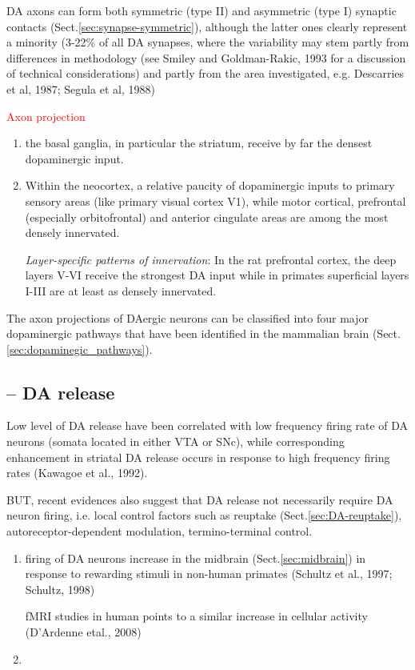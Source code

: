 DA axons can form both symmetric (type II) and asymmetric (type I) synaptic
contacts (Sect.\ref{sec:synapse-symmetric}), although the latter ones clearly
represent a minority (3-22\% of all DA synapses, where the variability may stem
partly from differences in methodology (see Smiley and Goldman-Rakic, 1993 for a
discussion of technical considerations) and partly from the area investigated,
e.g. Descarries et al, 1987; Segula et al, 1988)

\textcolor{red}{Axon projection}
\begin{enumerate}
  \item the basal ganglia, in particular the striatum, receive by far the
  densest dopaminergic input.
  
  \item Within the neocortex,  a relative paucity of dopaminergic inputs to
  primary sensory areas (like primary visual cortex V1), while motor cortical,
  prefrontal (especially orbitofrontal) and anterior cingulate areas are among
  the most densely innervated.
  
  {\it Layer-specific patterns of innervation}:
  In the rat prefrontal cortex, the deep layers V-VI receive the strongest DA
  input while in primates superficial layers I-III are at least as densely
  innervated.
\end{enumerate}
The axon projections of DAergic neurons can be classified into four major
dopaminergic pathways that have been identified in the mammalian brain
(Sect.\ref{sec:dopaminegic_pathways}).

\subsection{-- DA release}

Low level of DA release have been correlated with low frequency firing rate of
DA neurons (somata located in either VTA or SNc), while corresponding
enhancement in striatal DA release occurs in response to high frequency firing
rates (Kawagoe et al., 1992). 

BUT, recent evidences also suggest that DA release not necessarily require DA
neuron firing, i.e. local control factors such as reuptake
(Sect.\ref{sec:DA-reuptake}), autoreceptor-dependent modulation,
termino-terminal control.

\begin{enumerate}
  \item firing of DA neurons increase in the midbrain (Sect.\ref{sec:midbrain})
  in response to rewarding stimuli in non-human primates (Schultz et al., 1997; Schultz, 1998)
  
 fMRI studies in human points to a similar
 increase in cellular activity (D'Ardenne etal., 2008)

  \item 
\end{enumerate}

